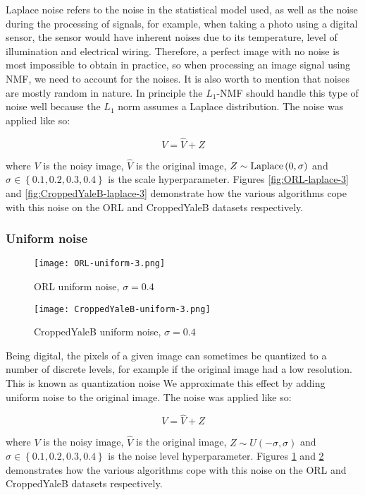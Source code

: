 \documentclass{article} %
\begin{document}
Laplace noise refers to the noise in the statistical model used, as well as the noise during the processing of signals, for example, when taking a photo using a digital sensor, the sensor would have inherent noises due to its temperature, level of illumination and electrical wiring. Therefore, a perfect image with no noise is most impossible to obtain in practice, so when processing an image signal using NMF, we need to account for the noises. It is also worth to mention that noises are mostly random in nature. In principle the $L_1$-NMF should handle this type of noise well because the $L_1$ norm assumes a Laplace distribution. \cite{yang-zhang-yang-zhang} The noise was applied like so:

\begin{equation}
V = \hat{V} + Z
\end{equation}

where $V$ is the noisy image, $\hat{V}$ is the original image, $Z \sim \textup{Laplace}\left(0,\sigma\right)$ and $\sigma \in \left\{0.1,0.2,0.3,0.4\right\}$ is the scale hyperparameter. Figures \ref{fig:ORL-laplace-3} and \ref{fig:CroppedYaleB-laplace-3} demonstrate how the various algorithms cope with this noise on the ORL and CroppedYaleB datasets respectively.

\subsubsection{Uniform noise}
\begin{figure}
\texttt{[image: ORL-uniform-3.png]}
\caption{ORL uniform noise, $\sigma=0.4$ \label{fig:ORL-uniform-3}}
\end{figure}
\begin{figure}
\texttt{[image: CroppedYaleB-uniform-3.png]}
\caption{CroppedYaleB uniform noise, $\sigma=0.4$ \label{fig:CroppedYaleB-uniform-3}}
\end{figure}

Being digital, the pixels of a given image can sometimes be quantized to a number of discrete levels, for example if the original image had a low resolution. This is known as quantization noise \cite{noise} We approximate this effect by adding uniform noise to the original image. The noise was applied like so:

\begin{equation}
V = \hat{V} + Z
\end{equation}

where $V$ is the noisy image, $\hat{V}$ is the original image, $Z \sim U\left(-\sigma,\sigma\right)$ and $\sigma \in \left\{0.1,0.2,0.3,0.4\right\}$ is the noise level hyperparameter. Figures \ref{fig:ORL-uniform-3} and \ref{fig:CroppedYaleB-uniform-3} demonstrates how the various algorithms cope with this noise on the ORL and CroppedYaleB datasets respectively.
\end{document}

